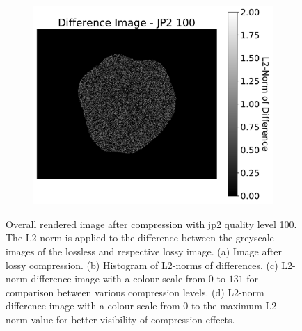 \begin{figure}[htb]
    \begin{subfigure}[b]{0.48\textwidth}
        \centering
        \includegraphics[width=\textwidth]{doc/thesis/0_figures/compare_quality/set1/jp2_100_diff_heatmap_rel}
        \caption{}
        \label{fig:img_quality_comp_jp2_100_diff_rel}
    \end{subfigure}
    \caption{Overall rendered image after compression with \gls{jp2} quality level 100. The L2-norm is applied to the difference between the greyscale images of the lossless and respective lossy image. (a) Image after lossy compression. (b) Histogram of L2-norms of differences. (c) L2-norm difference image with a colour scale from $0$ to $131$ for comparison between various compression levels. (d) L2-norm difference image with a colour scale from $0$ to the maximum L2-norm value for better visibility of compression effects.}
    \label{fig:img_quality_comp_jp2_100}
\end{figure}

